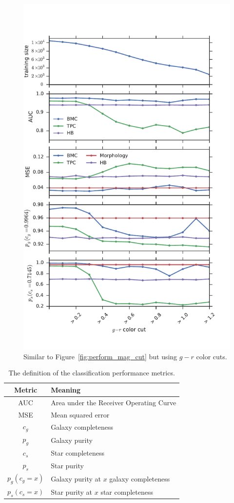 \begin{figure}[htp]
    \centering
    \includegraphics[width=0.7\linewidth]{figures/perform_g_r_cut.pdf}
    \caption{Similar to Figure~\ref{fig:perform_mag_cut}
        but using $g - r$ color cuts.}
    \label{fig:perform_g_r_cut}
\end{figure}

\clearpage
\begin{table}
  \centering
  \begin{tabular}{| c | l |}
  \hline
  Metric & Meaning \\
  \hline
  AUC & Area under the Receiver Operating Curve \\
  MSE & Mean squared error \\
  $c_g$ & Galaxy completeness \\
  $p_g$ & Galaxy purity \\
  $c_s$ & Star completeness \\
  $p_s$ & Star purity \\
  $p_g(c_g=x)$ & Galaxy purity at $x$ galaxy completeness \\
  $p_s(c_s=x)$ & Star purity at $x$ star completeness \\
  \hline
  \end{tabular}
  \caption{The definition of the classification performance metrics.}
  \label{table:metrics}
\end{table}

